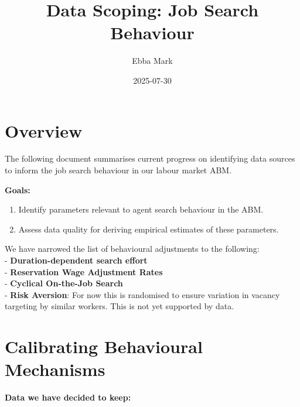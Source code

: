 \documentclass[
]{article}
\title{Data Scoping: Job Search Behaviour}
\author{Ebba Mark}
\date{2025-07-30}
\begin{document}
\maketitle

\section{Overview}\label{overview}

The following document summarises current progress on identifying data
sources to inform the job search behaviour in our labour market ABM.

\textbf{Goals:}

\begin{enumerate}
\def\labelenumi{\arabic{enumi}.}
\item
  Identify parameters relevant to agent search behaviour in the ABM.
\item
  Assess data quality for deriving empirical estimates of these
  parameters.
\end{enumerate}

We have narrowed the list of behavioural adjustments to the following:\\
- \textbf{Duration-dependent search effort}\\
- \textbf{Reservation Wage Adjustment Rates}\\
- \textbf{Cyclical On-the-Job Search}\\
- \textbf{Risk Aversion}: For now this is randomised to ensure variation
in vacancy targeting by similar workers. This is not yet supported by
data.

\section{Calibrating Behavioural
Mechanisms}\label{calibrating-behavioural-mechanisms}

\textbf{Data we have decided to keep:}
\end{document}
